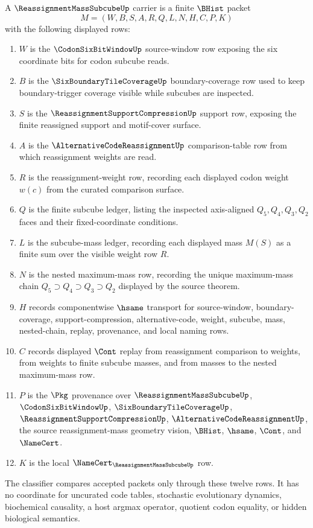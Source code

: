 \begin{definition}
\label{def:reassignment-mass-subcube-carrier}
A $\ReassignmentMassSubcubeUp$ carrier is a finite $\BHist$ packet
$$
M=(W,B,S,A,R,Q,L,N,H,C,P,K)
$$
with the following displayed rows:
\begin{enumerate}
\item $W$ is the $\CodonSixBitWindowUp$ source-window row exposing the six coordinate bits for codon subcube reads.
\item $B$ is the $\SixBoundaryTileCoverageUp$ boundary-coverage row used to keep boundary-trigger coverage visible while subcubes are inspected.
\item $S$ is the $\ReassignmentSupportCompressionUp$ support row, exposing the finite reassigned support and motif-cover surface.
\item $A$ is the $\AlternativeCodeReassignmentUp$ comparison-table row from which reassignment weights are read.
\item $R$ is the reassignment-weight row, recording each displayed codon weight $w(c)$ from the curated comparison surface.
\item $Q$ is the finite subcube ledger, listing the inspected axis-aligned $Q_5,Q_4,Q_3,Q_2$ faces and their fixed-coordinate conditions.
\item $L$ is the subcube-mass ledger, recording each displayed mass $M(S)$ as a finite sum over the visible weight row $R$.
\item $N$ is the nested maximum-mass row, recording the unique maximum-mass chain $Q_5\supset Q_4\supset Q_3\supset Q_2$ displayed by the source theorem.
\item $H$ records componentwise $\hsame$ transport for source-window, boundary-coverage, support-compression, alternative-code, weight, subcube, mass, nested-chain, replay, provenance, and local naming rows.
\item $C$ records displayed $\Cont$ replay from reassignment comparison to weights, from weights to finite subcube masses, and from masses to the nested maximum-mass row.
\item $P$ is the $\Pkg$ provenance over $\ReassignmentMassSubcubeUp$, $\CodonSixBitWindowUp$, $\SixBoundaryTileCoverageUp$, $\ReassignmentSupportCompressionUp$, $\AlternativeCodeReassignmentUp$, the source reassignment-mass geometry vision, $\BHist$, $\hsame$, $\Cont$, and $\NameCert$.
\item $K$ is the local $\NameCert_{\ReassignmentMassSubcubeUp}$ row.
\end{enumerate}
The classifier compares accepted packets only through these twelve rows. It has no coordinate for uncurated code tables, stochastic evolutionary dynamics, biochemical causality, a host argmax operator, quotient codon equality, or hidden biological semantics.
\end{definition}

